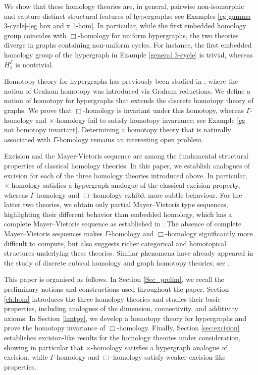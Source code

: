 \documentclass[10pt,a4paper]{amsart}
\begin{document}
We show that these homology theories are, in general, pairwise non-isomorphic and capture distinct structural features of hypergraphs; see Examples \ref{eg gamma 3-cycle}-\ref{eg box and x 1-hom}. In particular, while the first embedded homology group coincides with $\Box$-homology for uniform hypergraphs, the two theories diverge in graphs containing non-uniform cycles. For instance, the first embedded homology group of the hypergraph in Example \ref{general 3-cycle} is trivial, whereas $H_1^\Gamma$ is nontrivial.

 Homotopy theory for hypergraphs has previously been studied in \cite{HG_Chen01}, where the notion of Graham homotopy was introduced via Graham reductions. We define a notion of homotopy for hypergraphs that extends the discrete homotopy theory of graphs. We prove that $\Box$-homology is invariant under this homotopy, whereas $\Gamma$-homology and $\times$-homology fail to satisfy homotopy invariance; see Example \ref{eg not homotopy invariant}. Determining a homotopy theory that is naturally associated with $\Gamma$-homology remains an interesting open problem.

Excision and the Mayer-Vietoris sequence are among the fundamental structural properties of classical homology theories. In this paper, we establish analogues of excision for each of the three homology theories introduced above. In particular, $\times$-homology satisfies a hypergraph analogue of the classical excision property, whereas $\Gamma$-homology and $\Box$-homology exhibit more subtle behaviour. For the latter two theories, we obtain only partial Mayer--Vietoris type sequences, highlighting their different behavior than embedded homology, which has a complete Mayer--Vietoris sequence as established in \cite{HG_Bressan}. The absence of complete Mayer--Vietoris sequences makes $\Gamma$-homology and $\Box$-homology significantly more difficult to compute, but also suggests richer categorical and homotopical structures underlying these theories. Similar phenomena have already appeared in the study of discrete cubical homology and graph homotopy theories; see \cite{HG_Kapulkin25}.


This paper is organised as follows. In Section \ref{Sec_prelim}, we recall the preliminary notions and constructions used throughout the paper. Section \ref{ch.hom} introduces the three homology theories and studies their basic properties, including analogues of the dimension, connectivity, and additivity axioms. In Section \ref{hmtpy}, we develop a homotopy theory for hypergraphs and prove the homotopy invariance of $\Box$-homology. Finally, Section \ref{sec:excision} establishes excision-like results for the homology theories under consideration, showing in particular that $\times$-homology satisfies a hypergraph analogue of excision, while $\Gamma$-homology and $\Box$-homology satisfy weaker excision-like properties.
\end{document}
